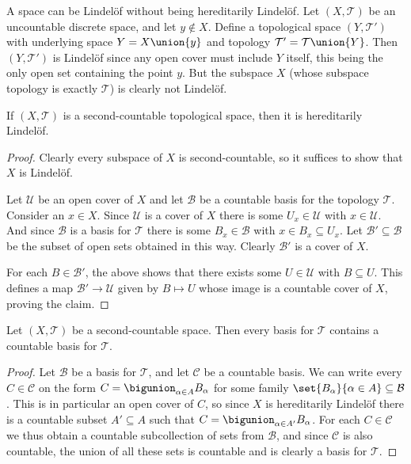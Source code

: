 \documentclass[article, a4paper, 11pt, oneside]{memoir}
\numberwithin{equation}{chapter}
\newcommand{\calT}{\mathcal{T}}
\newcommand{\calU}{\mathcal{U}}
\newcommand{\calB}{\mathcal{B}}
\newcommand{\calC}{\mathcal{C}}
\begin{document}
\begin{remark}
    A space can be Lindelöf without being hereditarily Lindelöf. Let $(X, \calT)$ be an uncountable discrete space, and let $y \not\in X$. Define a topological space $(Y, \calT')$ with underlying space $ Y = X \union \{y\}$ and topology $\calT' = \calT \union \{Y\}$. Then $(Y, \calT')$ is Lindelöf since any open cover must include $Y$ itself, this being the only open set containing the point $y$. But the subspace $X$ (whose subspace topology is exactly $\calT$) is clearly not Lindelöf.
\end{remark}


\begin{proposition}
    If $(X,\calT)$ is a second-countable topological space, then it is hereditarily Lindelöf.
\end{proposition}

\begin{proof}
    Clearly every subspace of $X$ is second-countable, so it suffices to show that $X$ is Lindelöf.
    
    Let $\calU$ be an open cover of $X$ and let $\calB$ be a countable basis for the topology $\calT$. Consider an $x \in X$. Since $\calU$ is a cover of $X$ there is some $U_x \in \calU$ with $x \in \calU$. And since $\calB$ is a basis for $\calT$ there is some $B_x \in \calB$ with $x \in B_x \subseteq U_x$. Let $\calB' \subseteq \calB$ be the subset of open sets obtained in this way. Clearly $\calB'$ is a cover of $X$.
    
    For each $B \in \calB'$, the above shows that there exists some $U \in \calU$ with $B \subseteq U$. This defines a map $\calB' \to \calU$ given by $B \mapsto U$ whose image is a countable cover of $X$, proving the claim.
\end{proof}


\begin{lemma}
    \label{thm:countable_basis}
    Let $(X, \calT)$ be a second-countable space. Then every basis for $\calT$ contains a countable basis for $\calT$.
\end{lemma}

\begin{proof}
    Let $\calB$ be a basis for $\calT$, and let $\calC$ be a countable basis. We can write every $C \in \calC$ on the form $C = \bigunion_{\alpha \in A} B_\alpha$ for some family $\set{B_\alpha}{\alpha \in A} \subseteq \calB$. This is in particular an open cover of $C$, so since $X$ is hereditarily Lindelöf there is a countable subset $A' \subseteq A$ such that $C = \bigunion_{\alpha \in A'} B_\alpha$. For each $C \in \calC$ we thus obtain a countable subcollection of sets from $\calB$, and since $\calC$ is also countable, the union of all these sets is countable and is clearly a basis for $\calT$.
\end{proof}
\end{document}
